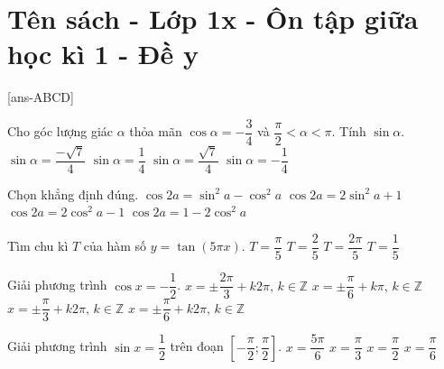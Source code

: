 \section{Tên sách - Lớp 1x - Ôn tập giữa học kì 1 - Đề y}
\caulc
{}[ans-ABCD]
\begin{ex}%
	Cho góc lượng giác $\alpha$ thỏa mãn $\cos \alpha=-\dfrac{3}{4}$ và $\dfrac{\pi}{2}<\alpha<\pi$. Tính $\sin \alpha$.
	\choice
	{$\sin \alpha=\dfrac{-\sqrt{7}}{4}$}
	{$\sin \alpha=\dfrac{1}{4}$}
	{\True $\sin \alpha=\dfrac{\sqrt{7}}{4}$}
	{$\sin \alpha=-\dfrac{1}{4}$}
\end{ex}

\begin{ex}%
	Chọn khẳng định đúng.
	\choice
	{$\cos2a=\sin^2 a-\cos^2 a$}
	{$\cos2a=2 \sin^2 a+1$}
	{\True $\cos2a=2 \cos^2 a-1$}
	{$\cos2a=1-2 \cos^2 a$}
\end{ex}

\begin{ex}%
	Tìm chu kì $T$ của hàm số $y=\tan (5 \pi x)$.
	\choice
	{$T=\dfrac{\pi}{5}$}
	{$T=\dfrac{2}{5}$}
	{$T=\dfrac{2 \pi}{5}$}
	{\True $T=\dfrac{1}{5}$}
\end{ex}

\begin{ex}%
	Giải phương trình $\cos x=-\dfrac{1}{2}$.
	\choice
	{\True $x= \pm \dfrac{2 \pi}{3}+k 2 \pi,\,k\in\mathbb{Z}$}
	{$x= \pm \dfrac{\pi}{6}+k \pi,\,k\in\mathbb{Z}$}
	{$x= \pm \dfrac{\pi}{3}+k 2 \pi,\,k\in\mathbb{Z}$}
	{$x= \pm \dfrac{\pi}{6}+k 2 \pi,\,k\in\mathbb{Z}$}
\end{ex}

\begin{ex}%
	Giải phương trình $\sin x=\dfrac{1}{2}$ trên đoạn $\left[-\dfrac{\pi}{2}; \dfrac{\pi}{2}\right]$.
	\choice
	{$x=\dfrac{5 \pi}{6}$}
	{$x=\dfrac{\pi}{3}$}
	{$x=\dfrac{\pi}{2}$}
	{\True $x=\dfrac{\pi}{6}$}
\end{ex}

